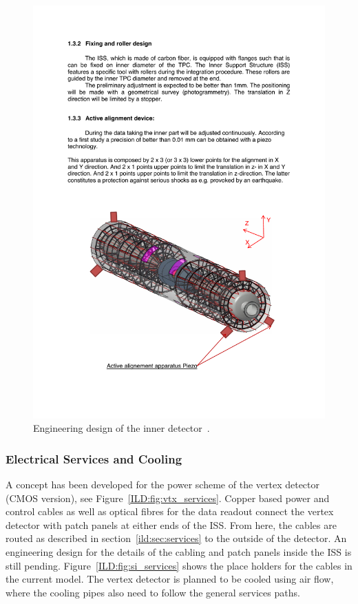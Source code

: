 \begin{figure}[h!]
    \centering
        \includegraphics[width=0.8\hsize]{Integration/fig/Inner_Detector_Integration.pdf}
    \caption{Engineering design of the inner detector~\cite{ild:bib:inner_detector_integration}.}
    \label{ILD:fig:inner_detector_integration}
\end{figure}

\subsubsection{Electrical Services and Cooling}
A concept has been developed for the power scheme of the vertex detector (CMOS version), see Figure~\ref{ILD:fig:vtx_services}. Copper based power and control cables as well as optical fibres for the data readout connect the vertex detector with patch panels at either ends of the ISS. From here, the cables are routed as described in section~\ref{ild:sec:services} to the outside of the detector. An engineering design for the details of the cabling and patch panels inside the ISS is still pending. Figure~\ref{ILD:fig:si_services} shows the place holders for the cables in the current model. The vertex detector is planned to be cooled using air flow, where the cooling pipes also need to follow the general services paths.

